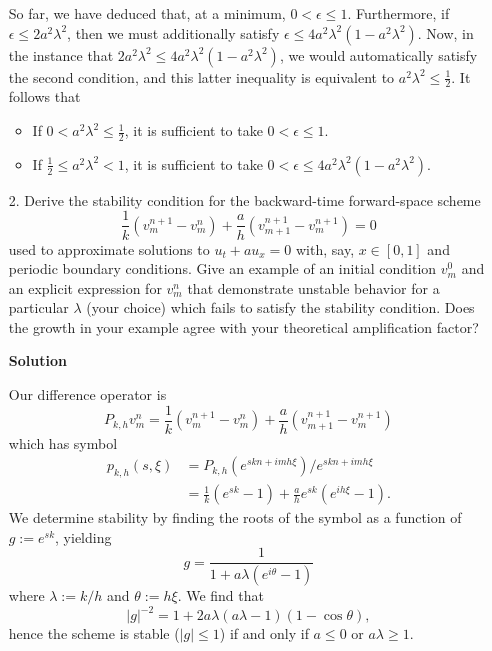 \documentclass{article}
\providecommand{\abs}[1]{\left\lvert#1\right\rvert}
\begin{document}
\begin{itemize}
So far, we have deduced that, at a minimum, $0 < \epsilon \leq 1$. Furthermore, if $\epsilon \leq 2 a^2 \lambda^2$, then we must additionally satisfy $\epsilon \leq 4 a^2 \lambda^2 \left( 1 - a^2 \lambda^2 \right)$. Now, in the instance that $2 a^2 \lambda^2 \leq 4 a^2 \lambda^2 \left( 1 - a^2 \lambda^2 \right)$, we would automatically satisfy the second condition, and this latter inequality is equivalent to $a^2 \lambda^2 \leq \frac{1}{2}$. It follows that
\begin{itemize}
\item If $0 < a^2 \lambda^2 \leq \frac{1}{2}$, it is sufficient to take $0 < \epsilon \leq 1$.
\item If $\frac{1}{2} \leq a^2 \lambda^2 < 1$, it is sufficient to take $0 < \epsilon \leq 4 a^2 \lambda^2 \left( 1 - a^2 \lambda^2 \right)$.
\end{itemize}

\item[2.] Derive the stability condition for the backward-time forward-space scheme
\begin{equation*}
\frac{1}{k} \left( v^{n+1}_m - v^n_m \right) + \frac{a}{h} \left( v^{n+1}_{m+1} - v^{n+1}_m \right) = 0
\end{equation*}
used to approximate solutions to $u_t + a u_x = 0$ with, say, $x \in [0,1]$ and periodic boundary conditions. Give an example of an initial condition $v^0_m$ and an explicit expression for $v^n_m$ that demonstrate unstable behavior for a particular $\lambda$ (your choice) which fails to satisfy the stability condition. Does the growth in your example agree with your theoretical amplification factor?

\textbf{Solution}

Our difference operator is
\begin{equation*}
P_{k,h} v^n_m = \frac{1}{k} \left( v^{n+1}_m - v^n_m \right) + \frac{a}{h} \left( v^{n+1}_{m+1} - v^{n+1}_m \right)
\end{equation*}
which has symbol
\begin{align*}
p_{k,h}(s,\xi) & = P_{k,h} \left( e^{skn + imh\xi} \right) / e^{skn + imh\xi} \\
               & = \frac{1}{k} \left( e^{sk} - 1 \right) + \frac{a}{h} e^{sk} \left( e^{ih\xi} - 1 \right).
\end{align*}
We determine stability by finding the roots of the symbol as a function of $g := e^{sk}$, yielding
\begin{equation*}
g = \frac{1}{1 + a \lambda \left( e^{i\theta} - 1 \right)}
\end{equation*}
where $\lambda := k/h$ and $\theta := h \xi$. We find that
\begin{equation*}
\abs{g}^{-2} = 1 + 2 a \lambda \left( a \lambda - 1 \right) \left( 1 - \cos \theta \right),
\end{equation*}
hence the scheme is stable ($\abs{g} \leq 1$) if and only if $a \leq 0$ or $a \lambda \geq 1$.


\end{itemize}
\end{document}
